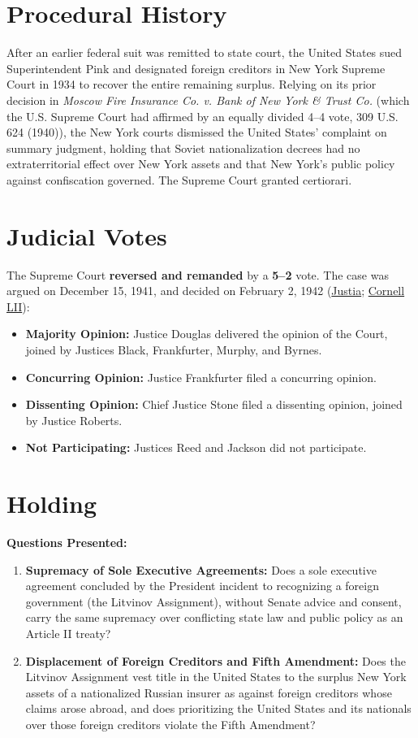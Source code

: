 \documentclass[12pt]{article}
\begin{document}
\section{Procedural History}
After an earlier federal suit was remitted to state court, the United States sued Superintendent Pink and designated foreign creditors in New York Supreme Court in 1934 to recover the entire remaining surplus. Relying on its prior decision in \textit{Moscow Fire Insurance Co. v. Bank of New York \& Trust Co.} (which the U.S. Supreme Court had affirmed by an equally divided 4--4 vote, 309 U.S. 624 (1940)), the New York courts dismissed the United States' complaint on summary judgment, holding that Soviet nationalization decrees had no extraterritorial effect over New York assets and that New York's public policy against confiscation governed. The Supreme Court granted certiorari.

\section{Judicial Votes}
The Supreme Court \textbf{reversed and remanded} by a \textbf{5--2} vote. The case was argued on December 15, 1941, and decided on February 2, 1942 (\href{https://supreme.justia.com/cases/federal/us/315/203/}{Justia}; \href{https://www.law.cornell.edu/supremecourt/text/315/203}{Cornell LII}):

\begin{itemize}
    \item \textbf{Majority Opinion:} Justice Douglas delivered the opinion of the Court, joined by Justices Black, Frankfurter, Murphy, and Byrnes.
    \item \textbf{Concurring Opinion:} Justice Frankfurter filed a concurring opinion.
    \item \textbf{Dissenting Opinion:} Chief Justice Stone filed a dissenting opinion, joined by Justice Roberts.
    \item \textbf{Not Participating:} Justices Reed and Jackson did not participate.
\end{itemize}

\section{Holding}
\textbf{Questions Presented:}

\begin{enumerate}
  \item \textbf{Supremacy of Sole Executive Agreements:} Does a sole executive agreement concluded by the President incident to recognizing a foreign government (the Litvinov Assignment), without Senate advice and consent, carry the same supremacy over conflicting state law and public policy as an Article II treaty?
  \item \textbf{Displacement of Foreign Creditors and Fifth Amendment:} Does the Litvinov Assignment vest title in the United States to the surplus New York assets of a nationalized Russian insurer as against foreign creditors whose claims arose abroad, and does prioritizing the United States and its nationals over those foreign creditors violate the Fifth Amendment?
\end{enumerate}
\end{document}
